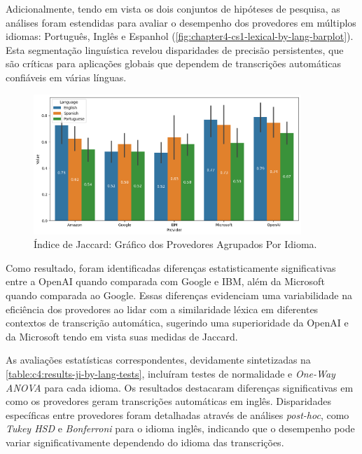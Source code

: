 Adicionalmente, tendo em vista os dois conjuntos de hipóteses de pesquisa, as análises foram estendidas para avaliar o desempenho dos provedores em múltiplos idiomas: Português, Inglês e Espanhol (\autoref{fig:chapter4-cs1-lexical-by-lang-barplot}). Esta segmentação linguística revelou disparidades de precisão persistentes, que são críticas para aplicações globais que dependem de transcrições automáticas confiáveis em várias línguas.

\begin{figure}[htb]
\centering
\caption{Índice de Jaccard: Gráfico dos Provedores Agrupados Por Idioma.}
\label{fig:chapter4-cs1-lexical-by-lang-barplot}
\includegraphics[width=0.9\textwidth]{images/chapter4-cs1-lexical-by-lang-barplot.png}
\end{figure}

Como resultado, foram identificadas diferenças estatisticamente significativas entre a OpenAI quando comparada com Google e IBM, além da Microsoft quando comparada ao Google. Essas diferenças evidenciam uma variabilidade na eficiência dos provedores ao lidar com a similaridade léxica em diferentes contextos de transcrição automática, sugerindo uma superioridade da OpenAI e da Microsoft tendo em vista suas medidas de Jaccard.

As avaliações estatísticas correspondentes, devidamente sintetizadas na \autoref{table:c4:results-ji-by-lang-tests}, incluíram testes de normalidade e \textit{One-Way ANOVA} para cada idioma. Os resultados destacaram diferenças significativas em como os provedores geram transcrições automáticas em inglês. Disparidades específicas entre provedores foram detalhadas através de análises \textit{post-hoc}, como \textit{Tukey HSD} e \textit{Bonferroni} para o idioma inglês, indicando que o desempenho pode variar significativamente dependendo do idioma das transcrições.

